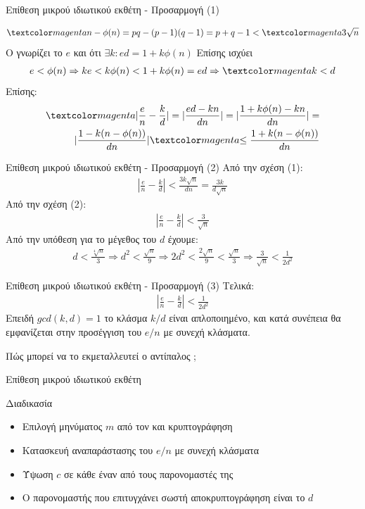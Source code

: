 \documentclass[handout]{beamer}
\begin{document}
\begin{frame}{Επίθεση μικρού ιδιωτικού εκθέτη - Προσαρμογή (1)} 

\begin{align}
\magenta{n-\phi(n)} = pq - (p-1)(q-1) = p + q -1 < \magenta{3\sqrt{n}}
\end{align}
\pause
O \adv γνωρίζει το $e$ και ότι $\exists k: ed  = 1 + k\phi(n)$ 
\pause
Επίσης ισχύει 
\begin{align}
e<\phi(n) \Rightarrow  ke < k\phi(n)<1+k\phi(n)=ed \Rightarrow \magenta{k < d}
\end{align}
\pause
Επίσης:
\begin{align*}
\magenta{|\frac{e}{n} - \frac{k}{d}|} =   |\frac{ed-kn}{dn}| =  |\frac{1+k\phi(n)-kn}{dn}| = \\ |\frac{1-k(n-\phi(n))}{dn}| \magenta{\leq \frac{1+k(n-\phi(n))}{dn}}
\end{align*}
\end{frame}

\begin{frame}{Επίθεση μικρού ιδιωτικού εκθέτη - Προσαρμογή (2)} 
Από την σχέση (1):
\begin{align*}
|\frac{e}{n} - \frac{k}{d}| < \frac{3k\sqrt{n}}{dn} = \frac{3k}{d\sqrt{n}}
\end{align*}
\pause
Από την σχέση (2):
\begin{align*}
|\frac{e}{n} - \frac{k}{d}| <   \frac{3}{\sqrt{n}}
\end{align*}
\pause
Από την υπόθεση για το μέγεθος του $d$ έχουμε: 
\begin{align*}
d < \frac{\sqrt[4]{n}}{3} \Rightarrow d^2 < \frac{\sqrt{n}}{9}  \Rightarrow 2d^2 < \frac{2\sqrt{n}}{9} < \frac{\sqrt{n}}{3} \Rightarrow \frac{3}{\sqrt{n}} < \frac{1}{2d^2}
\end{align*}
\end{frame}

\begin{frame}{Επίθεση μικρού ιδιωτικού εκθέτη - Προσαρμογή (3)} 
Τελικά:
\begin{align*}
|\frac{e}{n} - \frac{k}{d}| < \frac{1}{2d^2}
\end{align*}
\pause
Επειδή $gcd(k,d)=1$ το κλάσμα $k/d$ είναι απλοποιημένο, και κατά συνέπεια θα εμφανίζεται στην προσέγγιση του $e/n$ με συνεχή κλάσματα.
\pause

Πώς μπορεί να το εκμεταλλευτεί ο αντίπαλος \adv;
\end{frame}

\begin{frame}{Επίθεση μικρού ιδιωτικού εκθέτη}
\begin{block}{Διαδικασία}
\begin{itemize}
\item Επιλογή μηνύματος $m$ από τον \adv και κρυπτογράφηση
\pause
\item Κατασκευή αναπαράστασης του $e/n$ με συνεχή κλάσματα 
\pause
\item Ύψωση $c$ σε κάθε έναν από τους παρονομαστές της
\pause
\item Ο παρονομαστής που επιτυγχάνει σωστή αποκρυπτογράφηση είναι το $d$
\end{itemize}
\end{block}
\end{frame}
\end{document}
